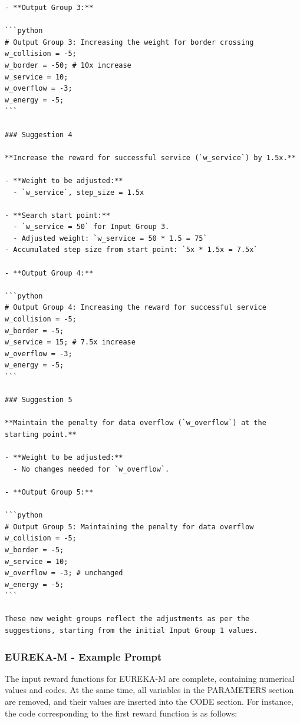 \documentclass{article}
\begin{document}
\begin{verbatim}
- **Output Group 3:**

```python
# Output Group 3: Increasing the weight for border crossing
w_collision = -5;
w_border = -50; # 10x increase
w_service = 10;
w_overflow = -3;
w_energy = -5;
```

### Suggestion 4

**Increase the reward for successful service (`w_service`) by 1.5x.**

- **Weight to be adjusted:**
  - `w_service`, step_size = 1.5x

- **Search start point:** 
  - `w_service = 50` for Input Group 3.
  - Adjusted weight: `w_service = 50 * 1.5 = 75`
- Accumulated step size from start point: `5x * 1.5x = 7.5x`
  
- **Output Group 4:**

```python
# Output Group 4: Increasing the reward for successful service
w_collision = -5;
w_border = -5;
w_service = 15; # 7.5x increase
w_overflow = -3;
w_energy = -5;
```

### Suggestion 5

**Maintain the penalty for data overflow (`w_overflow`) at the starting point.**

- **Weight to be adjusted:**
  - No changes needed for `w_overflow`.

- **Output Group 5:**

```python
# Output Group 5: Maintaining the penalty for data overflow
w_collision = -5;
w_border = -5;
w_service = 10;
w_overflow = -3; # unchanged
w_energy = -5;
```

These new weight groups reflect the adjustments as per the suggestions, starting from the initial Input Group 1 values.

\end{verbatim}

\subsubsection{EUREKA-M - Example Prompt}

The input reward functions for EUREKA-M are complete, containing numerical values and codes. At the same time, all variables in the PARAMETERS section are removed, and their values are inserted into the CODE section. For instance, the code corresponding to the first reward function is as follows:
\end{document}
